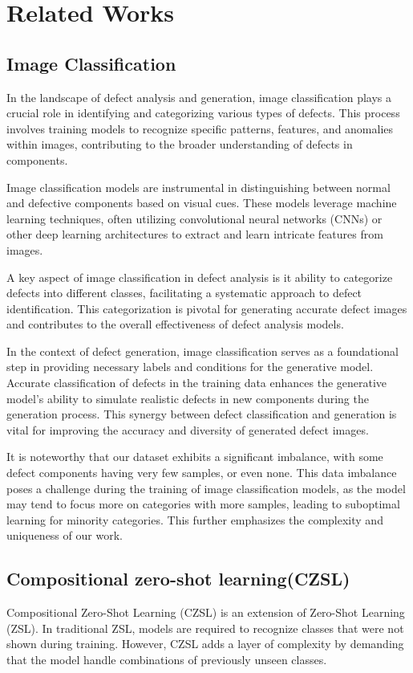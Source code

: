 \chapter{Related Works}
\label{chapter:doccls}
\section{Image Classification}
In the landscape of defect analysis and generation, image classification plays a crucial role in identifying and categorizing various types of defects. This process involves training models to recognize specific patterns, features, and anomalies within images, contributing to the broader understanding of defects in components.

Image classification models are instrumental in distinguishing between normal and defective components based on visual cues. These models leverage machine learning techniques, often utilizing convolutional neural networks (CNNs)\cite{Classification_with_CNN} or other deep learning architectures to extract and learn intricate features from images.

A key aspect of image classification in defect analysis is it ability to categorize defects into different classes, facilitating a systematic approach to defect identification. This categorization is pivotal for generating accurate defect images and contributes to the overall effectiveness of defect analysis models.

In the context of defect generation, image classification serves as a foundational step in providing necessary labels and conditions for the generative model. Accurate classification of defects in the training data enhances the generative model's ability to simulate realistic defects in new components during the generation process. This synergy between defect classification and generation is vital for improving the accuracy and diversity of generated defect images.

It is noteworthy that our dataset exhibits a significant imbalance, with some defect components having very few samples, or even none. This data imbalance poses a challenge during the training of image classification models, as the model may tend to focus more on categories with more samples, leading to suboptimal learning for minority categories. This further emphasizes the complexity and uniqueness of our work.

\section{Compositional zero-shot learning(CZSL)}
Compositional Zero-Shot Learning (CZSL)\cite{CZSL,CZSL_1,CZSL_2,CZSL_3,CZSL_4,CZSL_5} is an extension of Zero-Shot Learning (ZSL)\cite{zero-shot-learning,zero-shot-learning_1,zero-shot-learning_2,zero-shot-learning_3,zero-shot-learning_4,zero-shot-learning_5,zero-shot-learning_6}. In traditional ZSL, models are required to recognize classes that were not shown during training. However, CZSL adds a layer of complexity by demanding that the model handle combinations of previously unseen classes.


